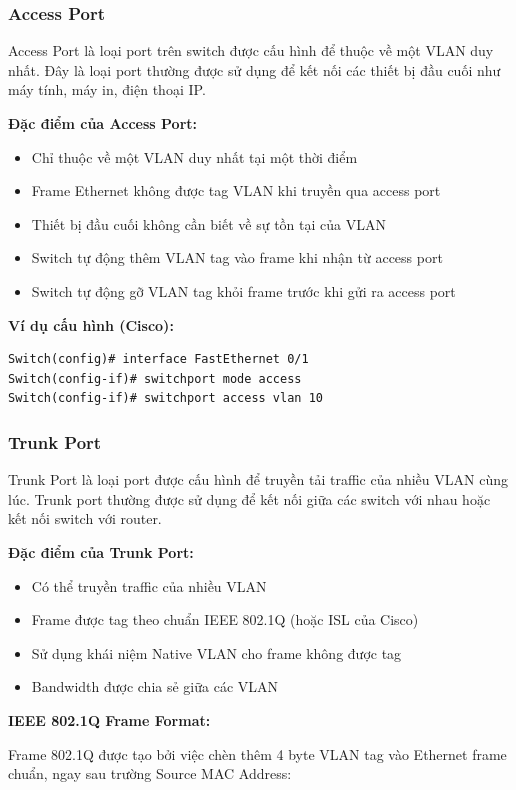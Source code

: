 \subsubsection{Access Port}
Access Port là loại port trên switch được cấu hình để thuộc về một VLAN duy nhất. Đây là loại port thường được sử dụng để kết nối các thiết bị đầu cuối như máy tính, máy in, điện thoại IP.

\textbf{Đặc điểm của Access Port:}
\begin{itemize}
    \item Chỉ thuộc về một VLAN duy nhất tại một thời điểm
    \item Frame Ethernet không được tag VLAN khi truyền qua access port
    \item Thiết bị đầu cuối không cần biết về sự tồn tại của VLAN
    \item Switch tự động thêm VLAN tag vào frame khi nhận từ access port
    \item Switch tự động gỡ VLAN tag khỏi frame trước khi gửi ra access port
\end{itemize}

\textbf{Ví dụ cấu hình (Cisco):}
\begin{verbatim}
Switch(config)# interface FastEthernet 0/1
Switch(config-if)# switchport mode access
Switch(config-if)# switchport access vlan 10
\end{verbatim}

\subsubsection{Trunk Port}
Trunk Port là loại port được cấu hình để truyền tải traffic của nhiều VLAN cùng lúc. Trunk port thường được sử dụng để kết nối giữa các switch với nhau hoặc kết nối switch với router.

\textbf{Đặc điểm của Trunk Port:}
\begin{itemize}
    \item Có thể truyền traffic của nhiều VLAN
    \item Frame được tag theo chuẩn IEEE 802.1Q (hoặc ISL của Cisco)
    \item Sử dụng khái niệm Native VLAN cho frame không được tag
    \item Bandwidth được chia sẻ giữa các VLAN
\end{itemize}

\textbf{IEEE 802.1Q Frame Format:}

Frame 802.1Q được tạo bởi việc chèn thêm 4 byte VLAN tag vào Ethernet frame chuẩn, ngay sau trường Source MAC Address:

